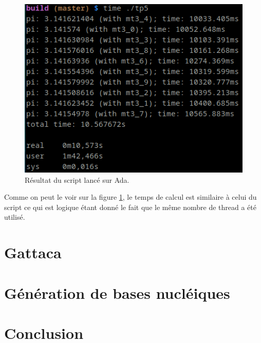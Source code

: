 \documentclass[a4paper]{article}
\begin{document}
\begin{figure}[ht!]
  \centering
  \includegraphics[scale=0.5]{./img/pi_threads.png}
  \caption{Résultat du script lancé sur Ada.}
  \label{fig:threads}
\end{figure}

Comme on peut le voir sur la figure \ref{fig:threads}, le temps de calcul est
similaire à celui du script ce qui est logique étant donné le fait que le même
nombre de thread a été utilisé.

\section{Gattaca}

\section{Génération de bases nucléiques}

\section{Conclusion}
\end{document}
